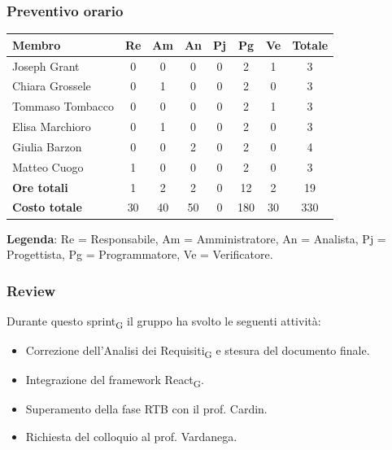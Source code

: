 \documentclass[11pt,a4paper]{article}
\newcommand{\gls}[1]{#1\textsubscript{G}}
\begin{document}
\subsubsection{Preventivo orario}
\begin{center}
    \begin{tabular}{|l|c|c|c|c|c|c|c|}
        \hline
        \textbf{Membro} & \textbf{Re} & \textbf{Am} & \textbf{An} & \textbf{Pj} & \textbf{Pg} & \textbf{Ve} & \textbf{Totale} \\
        \hline
        Joseph Grant & 0 & 0 & 0 & 0 & 2 & 1 & 3 \\
        \hline
        Chiara Grossele & 0 & 1 & 0 & 0 & 2 & 0 & 3 \\
        \hline
        Tommaso Tombacco & 0 & 0 & 0 & 0 & 2 & 1 & 3 \\
        \hline
        Elisa Marchioro & 0 & 1 & 0 & 0 & 2 & 0 & 3 \\
        \hline
        Giulia Barzon & 0 & 0 & 2 & 0 & 2 & 0 & 4 \\
        \hline
        Matteo Cuogo & 1 & 0 & 0 & 0 & 2 & 0 & 3 \\
        \hline
        \textbf{Ore totali} & 1 & 2 & 2 & 0 & 12 & 2 & 19 \\
        \hline
        \textbf{Costo totale} & 30 & 40 & 50 & 0 & 180 & 30 & 330 \\
        \hline
    \end{tabular}
\end{center}

\noindent \textbf{Legenda}: Re = Responsabile, Am = Amministratore, An = Analista, Pj = Progettista, Pg = Programmatore, Ve = Verificatore.

\subsubsection{Review}
Durante questo \gls{sprint} il gruppo ha svolto le seguenti attività:
\begin{itemize}
    \item Correzione dell'\gls{Analisi dei Requisiti} e stesura del documento finale.
    \item Integrazione del framework \gls{React}.
    \item Superamento della fase RTB con il prof. Cardin.
    \item Richiesta del colloquio al prof. Vardanega.
\end{itemize}
\end{document}
